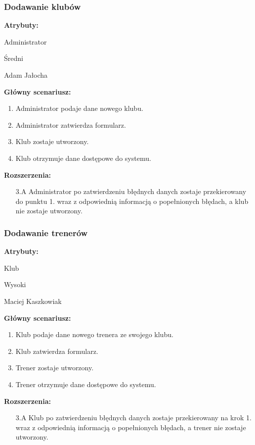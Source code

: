 \documentclass[polish, a4paper]{article}
\begin{document}
\subsubsection{Dodawanie klubów}
\noindent
\textbf{Atrybuty:}
\begin{description}[labelindent=0.5cm]
    \item[Główny aktor:]{Administrator}
    \item[Priorytet:]{Średni}
    \item[Źródło:]{Adam Jałocha}
\end{description}

\noindent
\textbf{Główny scenariusz:}
\begin{enumerate}
    \item Administrator podaje dane nowego klubu.
    \item Administrator zatwierdza formularz.
    \item Klub zostaje utworzony.
    \item Klub otrzymuje dane dostępowe do systemu.
\end{enumerate}
\noindent
\textbf{Rozszerzenia:}
\begin{itemize}
    \item[3.A] Administrator po zatwierdzeniu błędnych danych zostaje przekierowany do punktu 1. wraz z odpowiednią informacją o popełnionych błędach, a klub nie zostaje utworzony.
\end{itemize}

\subsubsection{Dodawanie trenerów}
\noindent
\textbf{Atrybuty:}
\begin{description}[labelindent=0.5cm]
    \item[Główny aktor:]{Klub}
    \item[Priorytet:]{Wysoki}
    \item[Źródło:]{Maciej Kaszkowiak}
\end{description}

\noindent
\textbf{Główny scenariusz:}
\begin{enumerate}
    \item Klub podaje dane nowego trenera ze swojego klubu.
    \item Klub zatwierdza formularz.
    \item Trener zostaje utworzony.
    \item Trener otrzymuje dane dostępowe do systemu.
\end{enumerate}
\noindent
\textbf{Rozszerzenia:}
\begin{itemize}
    \item[3.A] Klub po zatwierdzeniu błędnych danych zostaje przekierowany na krok 1. wraz z odpowiednią informacją o popełnionych błędach, a trener nie zostaje utworzony.
\end{itemize}
\end{document}
